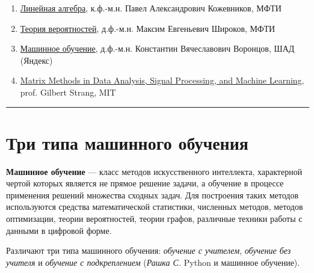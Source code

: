 \documentclass[11pt,a4paper]{article}
\renewcommand{\linethickness}{0.1ex}
\providecommand{\tightlist}{%
      \setlength{\itemsep}{0pt}\setlength{\parskip}{0pt}}
\begin{document}
\begin{enumerate}
\def\labelenumi{\arabic{enumi}.}
\tightlist
\item
  \href{https://www.youtube.com/watch?v=WNl10xl1QT8\&list=PLthfp5exSWEqSRXkZgMMzTSXL_WwMV9wK}{Линейная
  алгебра}, к.ф.-м.н. Павел Александрович Кожевников, МФТИ
\item
  \href{https://www.youtube.com/watch?v=Q3h9P7lhpNc\&list=PLyBWNG-pZKx7kLBRcNW3HXG05BDUrTQVr\&index=1}{Теория
  вероятностей}, д.ф.-м.н. Максим Евгеньевич Широков, МФТИ
\item
  \href{https://www.youtube.com/watch?v=SZkrxWhI5qM\&list=PLJOzdkh8T5krxc4HsHbB8g8f0hu7973fK\&index=1}{Машинное
  обучение}, д.ф.-м.н. Константин Вячеславович Воронцов, ШАД (Яндекс)
\item
  \href{https://www.youtube.com/watch?v=Cx5Z-OslNWE\&list=PLUl4u3cNGP63oMNUHXqIUcrkS2PivhN3k}{Matrix
  Methods in Data Analysis, Signal Processing, and Machine Learning},
  prof. Gilbert Strang, MIT
\end{enumerate}

    \begin{center}\rule{0.5\linewidth}{\linethickness}\end{center}

    \hypertarget{ux442ux440ux438-ux442ux438ux43fux430-ux43cux430ux448ux438ux43dux43dux43eux433ux43e-ux43eux431ux443ux447ux435ux43dux438ux44f}{%
\section{Три типа машинного
обучения}\label{ux442ux440ux438-ux442ux438ux43fux430-ux43cux430ux448ux438ux43dux43dux43eux433ux43e-ux43eux431ux443ux447ux435ux43dux438ux44f}}

\textbf{Машинное обучение} --- класс методов искусственного интеллекта,
характерной чертой которых является не прямое решение задачи, а обучение
в процессе применения решений множества сходных задач. Для построения
таких методов используются средства математической статистики, численных
методов, методов оптимизации, теории вероятностей, теории графов,
различные техники работы с данными в цифровой форме.

Различают три типа машинного обучения: \emph{обучение с учителем},
\emph{обучение без учителя} и \emph{обучение с подкреплением}
(\emph{Рашка С.} Python и машинное обучение).
\end{document}
